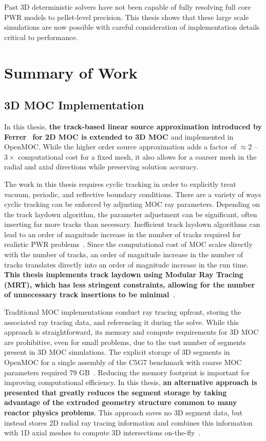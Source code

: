 Past 3D deterministic solvers have not been capable of fully resolving full core PWR models to pellet-level precision. This thesis shows that these large scale simulations are now possible with careful consideration of implementation details critical to performance. 


\section{Summary of Work}
\label{sec:work-summary}


\subsection{3D MOC Implementation}
\label{sec:sub:3dmoc-imp} 

In this thesis, \textbf{the track-based linear source approximation introduced by Ferrer}~\cite{ferrer2015linear} \textbf{for 2D MOC is extended to 3D MOC} and implemented in OpenMOC. While the higher order source approximation adds a factor of $\approx 2$ -- $3\times$ computational cost for a fixed mesh, it also allows for a coarser mesh in the radial and axial directions while preserving solution accuracy.

The work in this thesis requires cyclic tracking in order to explicitly treat vacuum, periodic, and reflective boundary conditions. There are a variety of ways cyclic tracking can be enforced by adjusting MOC ray parameters. Depending on the track laydown algorithm, the parameter adjustment can be significant, often inserting far more tracks than necessary. Inefficient track laydown algorithms can lead to an order of magnitude increase in the number of tracks required for realistic PWR problems~\cite{shaner-laydown}. Since the computational cost of MOC scales directly with the number of tracks, an order of magnitude increase in the number of tracks translates directly into an order of magnitude increase in the run time. \textbf{This thesis implements track laydown using Modular Ray Tracing (MRT), which has less stringent constraints, allowing for the number of unnecessary track insertions to be minimal}~\cite{liu_mrt}. 

Traditional MOC implementations conduct ray tracing upfront, storing the associated ray tracing data, and referencing it during the solve. While this approach is straightforward, its memory and compute requirements for 3D MOC are prohibitive, even for small problems, due to the vast number of segments present in 3D MOC simulations. The explicit storage of 3D segments in OpenMOC for a single assembly of the C5G7 benchmark with coarse MOC parameters required 79 GB~\cite{physor2016otf}. Reducing the memory footprint is important for improving computational efficiency. In this thesis, \textbf{an alternative approach is presented that greatly reduces the segment storage by taking advantage of the extruded geometry structure common to many reactor physics problems}. This approach saves no 3D segment data, but instead stores 2D radial ray tracing information and combines this information with 1D axial meshes to compute 3D intersections on-the-fly~\cite{physor2016otf}.

